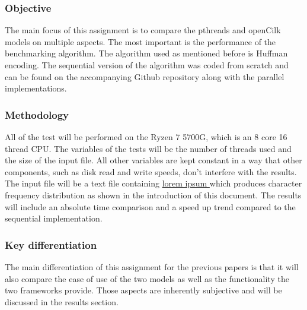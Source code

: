 \subsubsection*{Objective}

The main focus of this assignment is to compare the pthreads and openCilk models on multiple aspects. The most important is the performance of the benchmarking
algorithm. The algorithm used as mentioned before is Huffman encoding. The sequential version of the algorithm was coded from scratch and can be found on the
accompanying Github repository along with the parallel implementations.

\subsubsection*{Methodology}
All of the test will be performed on the Ryzen 7 5700G, which is an 8 core 16 thread CPU. The variables of the tests will be the number of threads used and the size of the input file.
All other variables are kept constant in a way that other components, such as disk read and write speeds, don't interfere with the results. The input file will be
a text file containing \href{https://loremipsum.io/}{lorem ipsum } which produces character frequency distribution as shown in the introduction of this document.
The results will include an absolute time comparison and a speed up trend compared to the sequential implementation.

\subsubsection*{Key differentiation}
The main differentiation of this assignment for the previous papers is that it will also compare the ease of use of the two models as well as the functionality
the two frameworks provide. Those aspects are inherently subjective and will be discussed in the results section.